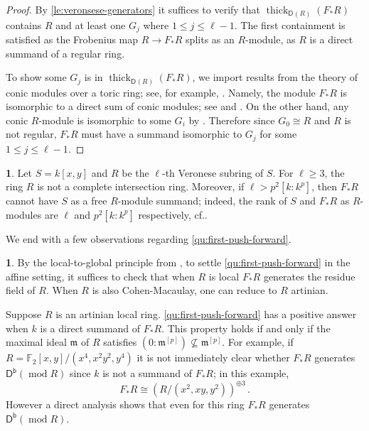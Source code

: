 \documentclass{amsart}
\newcommand{\dcat}[2][]{\cat{D}_{#1}(#2)}
\newcommand{\dbcat}[1]{\cat{D}^{\mathsf{b}}(#1)}
\newcommand{\fm}{\mathfrak{m}}
\newcommand{\cat}[1]{{\mathsf{#1}}}
\newcommand{\rmod}{\operatorname{mod}}
\newcommand{\thick}{\operatorname{thick}}
\theoremstyle{definition}
\newtheorem{chunk}[subsection]{}
\theoremstyle{remark}
\numberwithin{equation}{subsection}
\begin{document}
\begin{proof}
 By \cref{le:veronsese-generators} it suffices to verify that $\thick_{\dcat R}(F _*R)$ contains $R$ and at least one $G_j$ where $1 \leq j \leq \ell-1$. The first containment is satisfied as the Frobenius map $R \rightarrow F _*R$ splits as an $R$-module, as $R$ is a direct summand of a regular ring.
 
 To show some $G_j$ is in $\thick_{\dcat R}(F _*R)$, we import results from the theory of conic modules over a toric ring; see, for example, \cite{BrunsGubeladze,Faber/Muller/Smith:2019}. Namely, the module $F _*R$ is isomorphic to a direct sum of conic modules; see \cite[Proposition~4.15]{Faber/Muller/Smith:2019} and \cite[Theorem~3.1]{BrunsConic}. On the other hand, any conic $R$-module is isomorphic to some $G_i$ by \cite[Remark~7.6]{Faber/Muller/Smith:2019}. Therefore since $G_0\cong R$ and $R$ is not regular, $F _*R$ must have a summand isomorphic to $G_j$ for some $1\leq j\leq \ell -1.$
\end{proof}

\begin{chunk}
Let $S= k[x,y]$ and $R$ be the $\ell$-th Veronese subring of $S$. For $\ell\geq 3$, the ring $R$ is not a complete intersection ring. Moreover, if $\ell>p^2[k:k^p]$, then $F _*R$ cannot have $S$ as a free $R$-module summand; indeed, the rank of $S$ and $F _*R$ as $R$-modules are $\ell$ and $p^2[k:k^p]$ respectively, cf.\@ {}.
\end{chunk}

We end with a few observations regarding \cref{qu:first-push-forward}.

\begin{chunk}
\label{ch:qu-observations}
By the local-to-global principle from \cite[Corollary~3.4]{Letz:2021}, to settle \cref{qu:first-push-forward} in the affine setting, it suffices to check that when $R$ is local $F_*R$ generates the residue field of $R$. When $R$ is also Cohen-Macaulay, one can reduce to $R$ artinian.

Suppose $R$ is an artinian local ring. \cref{qu:first-push-forward} has a positive answer when $k$ is a direct summand of $F _*R$. This property holds if and only if the maximal ideal $\fm$ of $R$ satisfies $(0:\fm^{[p]})\not\subseteq \fm^{[p]}$. For example, if $R=\mathbb{F}_2[x,y]/(x^4,x^2y^2,y^4)$ it is not immediately clear whether $F _*R$ generates $\dbcat{\rmod R}$ since $k$ is not a summand of $F_*R$; in this example, 
\[
F _*R\cong (R/(x^2,xy,y^2))^{\oplus 3}\,.
\]
However a direct analysis shows that even for this ring $F_*R$ generates $\dbcat{\rmod R}.$
\end{chunk}
\end{document}
